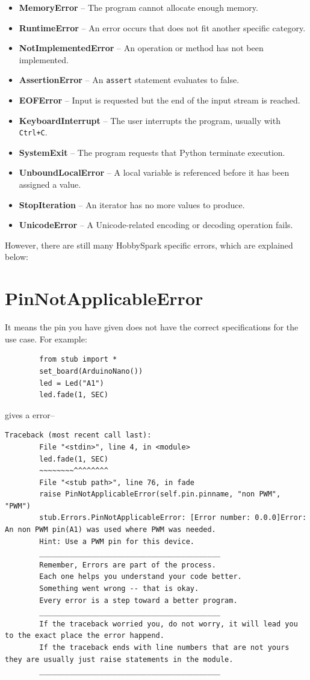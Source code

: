 \begin{itemize}
		\item \textbf{MemoryError} -- The program cannot allocate enough memory.
		\item \textbf{RuntimeError} -- An error occurs that does not fit another specific category.
		\item \textbf{NotImplementedError} -- An operation or method has not been implemented.
		\item \textbf{AssertionError} -- An \texttt{assert} statement evaluates to false.
		\item \textbf{EOFError} -- Input is requested but the end of the input stream is reached.
		\item \textbf{KeyboardInterrupt} -- The user interrupts the program, usually with \texttt{Ctrl+C}.
		\item \textbf{SystemExit} -- The program requests that Python terminate execution.
		\item \textbf{UnboundLocalError} -- A local variable is referenced before it has been assigned a value.
		\item \textbf{StopIteration} -- An iterator has no more values to produce.
		\item \textbf{UnicodeError} -- A Unicode-related encoding or decoding operation fails.
	\end{itemize}
	However, there are still many HobbySpark specific errors, which are explained below:
	\section{PinNotApplicableError} 
	It means the pin you have given does not have the correct specifications for the use case. For example: 
	\begin{lstlisting} 
		from stub import * 
		set_board(ArduinoNano()) 
		led = Led("A1") 
		led.fade(1, SEC) 
	\end{lstlisting} 
	gives a error-- 
	\begin{lstlisting}[style=tracebacks] 
		Traceback (most recent call last): 
		File "<stdin>", line 4, in <module> 
		led.fade(1, SEC) 
		~~~~~~~~^^^^^^^^ 
		File "<stub path>", line 76, in fade 
		raise PinNotApplicableError(self.pin.pinname, "non PWM", "PWM") 
		stub.Errors.PinNotApplicableError: [Error number: 0.0.0]Error: An non PWM pin(A1) was used where PWM was needed. 
		Hint: Use a PWM pin for this device. 
		__________________________________________ 
		Remember, Errors are part of the process.  
		Each one helps you understand your code better. 
		Something went wrong -- that is okay. 
		Every error is a step toward a better program. 
		__________________________________________ 
		If the traceback worried you, do not worry, it will lead you to the exact place the error happend. 
		If the traceback ends with line numbers that are not yours they are usually just raise statements in the module. 
		__________________________________________ 
		
	\end{lstlisting} 
	
